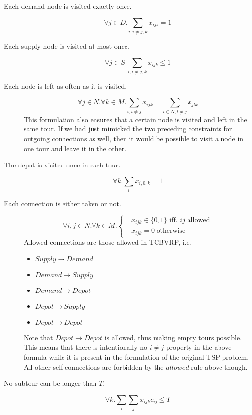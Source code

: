\begin{description}
  \item[Each demand node is visited exactly once.]
    \begin{equation}
      \forall j \in D. \sum_{i,i \neq j, k} x_{ijk} = 1
    \end{equation}
  \item[Each supply node is visited at most once.]
    \begin{equation}
      \forall j \in S. \sum_{i,i \neq j, k} x_{ijk} \leq 1
    \end{equation}
  \item[Each node is left as often as it is visited.]
    \begin{equation}
      \forall j \in N. \forall k \in M. \sum_{i,i \neq j} x_{ijk} = \sum_{l \in N, l \neq j} x_{jlk}
    \end{equation}
    This formulation also ensures that a certain node is visited
    and left in the same tour. If we had just mimicked the two 
    preceding constraints for outgoing connections as well,
    then it would be possible to visit a node in one tour
    and leave it in the other.        
  \item[The depot is visited once in each tour.]
    \begin{equation}
      \forall k. \sum_{i} x_{i,0,k} = 1
    \end{equation}
  \item[Each connection is either taken or not.]
    \begin{equation}
        \forall i,j \in N. \forall k \in M. \begin{cases} 
          &x_{ijk} \in \{0,1\} \mbox{ iff. $ij$ allowed} \\
          &x_{ijk} = 0 \mbox{ otherwise}
      \end{cases}
    \end{equation}
    Allowed connections are those allowed in TCBVRP, i.e.
    \begin{itemize}
      \item $Supply \rightarrow Demand$
      \item $Demand \rightarrow Supply$
      \item $Demand \rightarrow Depot$
      \item $Depot \rightarrow Supply$
      \item $Depot \rightarrow Depot$
    \end{itemize}

    Note that $Depot \rightarrow Depot$ is allowed, thus making empty tours possible. 
    This means that there is intentionally no $i \neq j$  property in the above 
    formula while it is present in the formulation
    of the original TSP problem. All other self-connections are forbidden by the 
    $allowed$ rule above though.

  \item[No subtour can be longer than $T$.]
    \begin{equation}
      \forall k. \sum_{i} \sum_{j} x_{ijk} c_{ij} \leq T
    \end{equation}
\end{description}

